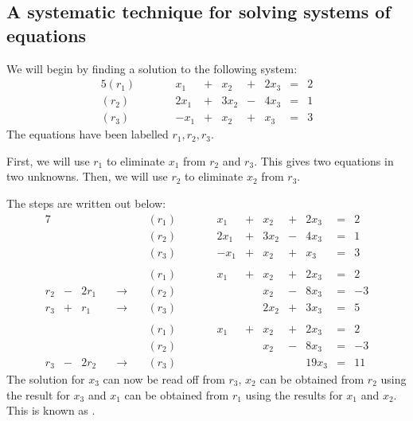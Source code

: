 \documentclass[letterpaper,10pt,english]{jupyterBook}
\begin{document}
\subsection{A systematic technique for solving systems of equations}
\label{\detokenize{LinearAlgebra/linear_systems_matrices/echelon_form:a-systematic-technique-for-solving-systems-of-equations}}\label{\detokenize{LinearAlgebra/linear_systems_matrices/echelon_form:id1}}
\sphinxAtStartPar
We will begin by finding a solution to the following system:
\begin{alignat*}{5}
(r_1) &\qquad&  x_1 & {}+{} &  x_2 & {}+{} & 2x_3 & {}={} &  2  \\
(r_2) &\qquad&     2x_1 & {}+{} &  3x_2 & {}-{} & 4x_3 & {}={} &  1  \\
(r_3) &\qquad&  -x_1 & {}+{} &  x_2 & {}+{} & x_3 & {}={} & 3
\end{alignat*}
\sphinxAtStartPar
The equations have been labelled \(r_1,r_2,r_3\).

\sphinxAtStartPar
First, we will use \(r_1\) to eliminate \(x_1\) from \(r_2\) and \(r_3\). This gives two equations in two unknowns. Then, we will use \(r_2\) to eliminate \(x_2\) from \(r_3\).

\sphinxAtStartPar
The steps are written out below:
\begin{alignat*}{7}
&&&& (r_1) &\qquad&  x_1 & {}+{} &  x_2 & {}+{} & 2x_3 & {}={} &  2  \\
&&&& (r_2) &\qquad&     2x_1 & {}+{} &  3x_2 & {}-{} & 4x_3 & {}={} &  1  \\
&&&& (r_3) &\qquad&  -x_1 & {}+{} &  x_2 & {}+{} & x_3 & {}={} & 3\\
\\  
&&&& (r_1) &\qquad&  x_1 & {}+{} &  x_2 & {}+{} & 2x_3 & {}={} &  2   \\
r_2 & {}-{} & 2r_1 &\quad\longrightarrow\quad& (r_2) &\qquad&      &  &  x_2 & {}-{} & 8x_3 & {}={} &  -3  \\
r_3 & {}+{} & r_1 &\quad\longrightarrow\quad& (r_3) &\qquad&   &  &  2x_2 & {}+{} & 3x_3 & {}={} & 5  \\
  \\
&&&& (r_1) &\qquad&  x_1 & {}+{} &  x_2 & {}+{} & 2x_3 & {}={} &  2   \\
&&&& (r_2) &\qquad&      &  &  x_2 & {}-{} & 8x_3 & {}={} &  -3  \\
r_3 & {}-{} & 2r_2 &\quad\longrightarrow\quad& (r_3) &\qquad&   &  &  & & 19x_3 & {}={} & 11

\end{alignat*}
\sphinxAtStartPar
The solution for \(x_3\) can now be read off from \(r_3\), \(x_2\) can be obtained from \(r_2\) using the result for \(x_3\) and \(x_1\) can be obtained from \(r_1\) using the results for \(x_1\) and \(x_2\). This is known as .
\end{document}
